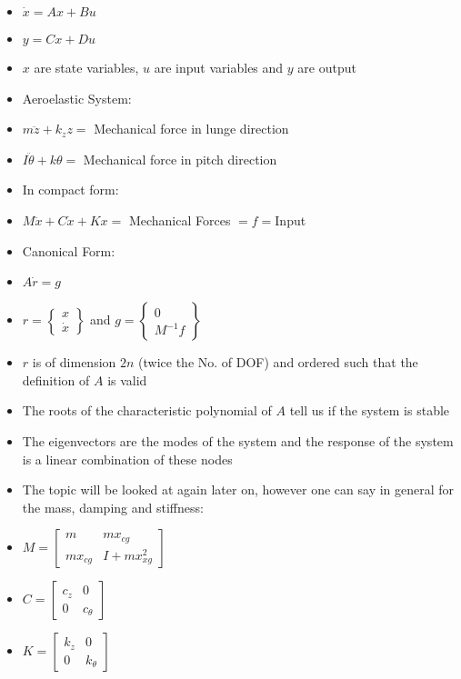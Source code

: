\documentclass[8pt, landscape, fleqn]{scrartcl}
\begin{document}
\begin{multicols*}{3}
\begin{itemize}
    \item $\dot{x} = Ax + B u$
    \item $y = Cx + Du$
    \item $x$ are state variables, $u$ are input variables and $y$ are output
    \item Aeroelastic System:
    \item $m \ddot{z} + k_z z = $ Mechanical force in lunge direction 
    \item $I \ddot{\theta} + k\theta = $ Mechanical force in pitch direction
    \item In compact form:
    \item $M \ddot{x} + C \dot{x} + K x = $ Mechanical Forces $ = f = $Input
    \item Canonical Form:
    \item $A \dot{r} = g$
    \item $r = \begin{Bmatrix}
        x \\ \dot{x}
    \end{Bmatrix}$  and $g = \begin{Bmatrix}
        0 \\ M^{-1}f
    \end{Bmatrix}$ 
    \item $r$ is of dimension $2n$ (twice the No. of DOF) and ordered such that the definition of $A$ is valid
    \item The roots of the characteristic polynomial of $A$ tell us if the system is stable 
    \item The eigenvectors are the modes of the system and the response of the system is a linear combination of these nodes
    \item The topic will be looked at again later on, however one can say in general for the mass, damping and stiffness:
    \item $M = \begin{bmatrix}
        m & m x_{cg} \\ mx_{cg} & I + mx_{xg}^2
    \end{bmatrix}$ 
    \item $C = \begin{bmatrix}
        c_z & 0 \\ 
        0 & c_\theta
    \end{bmatrix}$
    \item $K = \begin{bmatrix}
        k_z & 0  \\ 
        0 & k_{\theta} 
    \end{bmatrix}$
\end{itemize}


\end{multicols*}
\end{document}
